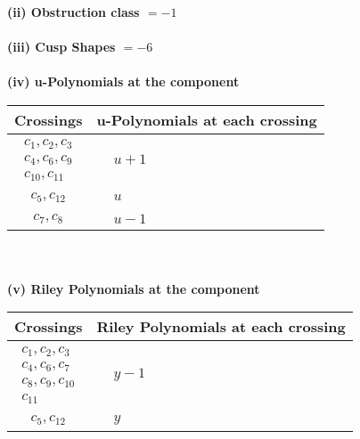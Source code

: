 \documentclass[1p]{elsarticle_modified}
\theoremstyle{definition}
\begin{document}
\flushleft \textbf{(ii) Obstruction class $= -1$}\\~\\
\flushleft \textbf{(iii) Cusp Shapes $= -6$}\\~\\
\newpage\renewcommand{\arraystretch}{1}
\flushleft \textbf{(iv) u-Polynomials at the component}\newline \\
\begin{tabular}{m{50pt}|m{274pt}}
Crossings & \hspace{64pt}u-Polynomials at each crossing \\
\hline $$\begin{aligned}c_{1},c_{2},c_{3}\\c_{4},c_{6},c_{9}\\c_{10},c_{11}\end{aligned}$$&$\begin{aligned}
&u+1
\end{aligned}$\\
\hline $$\begin{aligned}c_{5},c_{12}\end{aligned}$$&$\begin{aligned}
&u
\end{aligned}$\\
\hline $$\begin{aligned}c_{7},c_{8}\end{aligned}$$&$\begin{aligned}
&u-1
\end{aligned}$\\
\hline
\end{tabular}\\~\\
\newpage\renewcommand{\arraystretch}{1}
\flushleft \textbf{(v) Riley Polynomials at the component}\newline \\
\begin{tabular}{m{50pt}|m{274pt}}
Crossings & \hspace{64pt}Riley Polynomials at each crossing \\
\hline $$\begin{aligned}c_{1},c_{2},c_{3}\\c_{4},c_{6},c_{7}\\c_{8},c_{9},c_{10}\\c_{11}\end{aligned}$$&$\begin{aligned}
&y-1
\end{aligned}$\\
\hline $$\begin{aligned}c_{5},c_{12}\end{aligned}$$&$\begin{aligned}
&y
\end{aligned}$\\
\hline
\end{tabular}\\~\\
\end{document}
